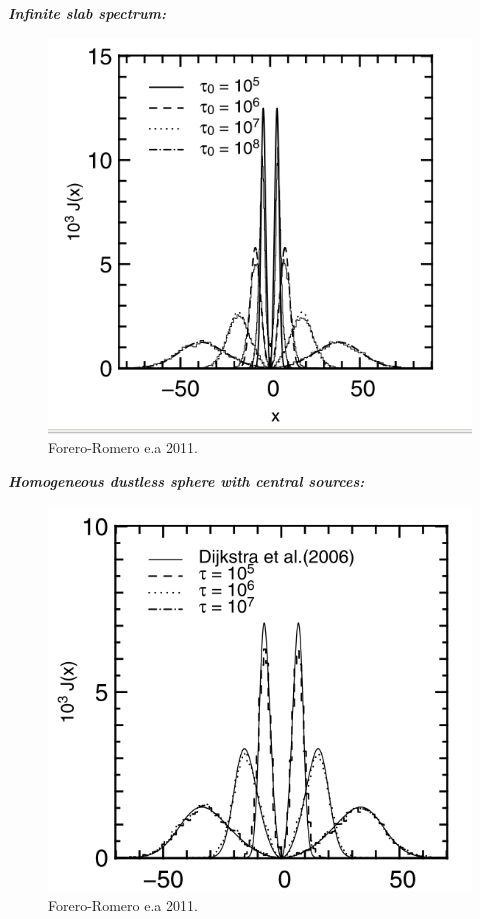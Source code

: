 \documentclass{beamer}
\begin{document}
\begin{frame}{\textit{\textbf{Infinite slab spectrum:}}}
\begin{figure}
\includegraphics[scale=0.4]{Figures/slab.png}
\caption*{Forero-Romero e.a 2011.}
\end{figure}
\end{frame}


\begin{frame}{\textit{\textbf{Homogeneous dustless sphere with central sources:}}}
\begin{figure}
\includegraphics[scale=0.2]{Figures/sphere.png}
\caption*{Forero-Romero e.a 2011.}
\end{figure}
\end{frame}
\end{document}
